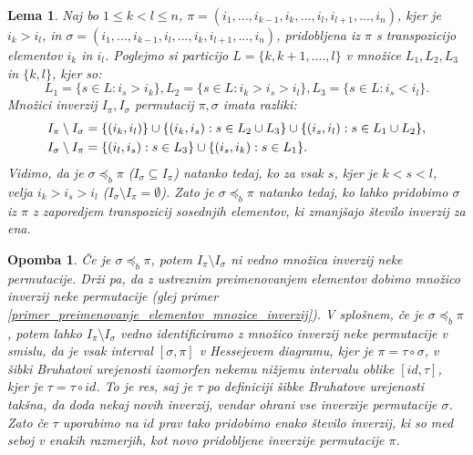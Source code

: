 \documentclass[a4paper, 12pt]{book}
\newtheorem{lema}{Lema}[chapter]
\newtheorem{opomba}{Opomba}[chapter]
\begin{document}
\begin{lema}
    Naj bo $1 \leq k < l \leq n$, $\pi = (i_1, ..., i_{k-1}, i_k, ..., i_l, i_{l+1}, ..., i_n)$, kjer je $i_k > i_l$, in $\sigma = (i_1, ..., i_{k-1}, i_l, ..., i_k, i_{l+1}, ..., i_n)$, pridobljena iz $\pi$ s transpozicijo elementov $i_k$ in $i_l$. Poglejmo si particijo $L = \{ k, k+ 1, ...., l\}$ v množice $L_1, L_2, L_3$ in $\{ k, l \}$, kjer so:
    \[
        L_1 = \{ s \in L: i_s > i_k \}, L_2 = \{ s \in L: i_k > i_s > i_l \}, L_3 = \{ s \in L: i_s < i_l \}.
    \]
    Množici inverzij $I_{\pi}, I_{\sigma}$ permutacij $\pi, \sigma$ imata razliki:
    \begin{align}
        I_{\pi} \setminus I_{\sigma} &= \{ (i_k, i_l) \} \cup \{ (i_k, i_s): s \in L_2 \cup L_3 \} \cup \{ (i_s, i_l): s \in L_1 \cup L_2 \}, \notag \\
        I_{\sigma} \setminus I_{\pi} &= \{ (i_l, i_s): s \in L_3 \} \cup \{ (i_s, i_k): s \in L_1 \}. \notag
    \end{align}
    Vidimo, da je $\sigma \preceq_b \pi$ ($I_{\sigma} \subseteq I_{\pi}$) natanko tedaj, ko za vsak $s$, kjer je $k < s < l$, velja $i_k > i_s > i_l$ ($I_{\sigma} \setminus I_{\pi} = \emptyset$). Zato je $\sigma \preceq_b \pi$ natanko tedaj, ko lahko pridobimo $\sigma$ iz $\pi$ z zaporedjem transpozicij sosednjih elementov, ki zmanjšajo število inverzij za ena.
\end{lema}

\begin{opomba}
    Če je $\sigma \preceq_b \pi$, potem $I_{\pi} \setminus I_{\sigma}$ ni vedno množica inverzij neke permutacije. Drži pa, da z ustreznim preimenovanjem elementov dobimo množico inverzij neke permutacije (glej primer \ref{primer_preimenovanje_elementov_mnozice_inverzij}). V splošnem, če je $\sigma \preceq_b \pi$, potem lahko $I_{\pi} \setminus I_{\sigma}$ vedno identificiramo z množico inverzij neke permutacije v smislu, da je vsak interval $[\sigma, \pi]$ v Hessejevem diagramu, kjer je $\pi = \tau \circ \sigma$, v šibki Bruhatovi urejenosti izomorfen nekemu nižjemu intervalu oblike $[id, \tau]$, kjer je $\tau = \tau \circ id$. To je res, saj je $\tau$ po definiciji šibke Bruhatove urejenosti takšna, da doda nekaj novih inverzij, vendar ohrani vse inverzije permutacije $\sigma$. Zato če $\tau$ uporabimo na $id$ prav tako pridobimo enako število inverzij, ki so med seboj v enakih razmerjih, kot novo pridobljene inverzije permutacije $\pi$.
\end{opomba}
\end{document}
